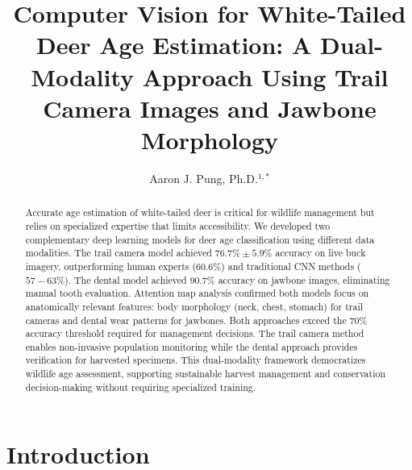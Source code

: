 \documentclass{iopjournal}
\begin{document}

\title{Computer Vision for White-Tailed Deer Age Estimation: A Dual-Modality Approach Using Trail Camera Images and Jawbone Morphology}

\author{Aaron J. Pung, Ph.D.$^{1,*}$}



\begin{abstract}
Accurate age estimation of white-tailed deer is critical for wildlife management but relies on specialized expertise that limits accessibility. We developed two complementary deep learning models for deer age classification using different data modalities. The trail camera model achieved $76.7\% \pm  5.9\%$ accuracy on live buck imagery, outperforming human experts ($60.6\%$) and traditional CNN methods ($57-63\%$). The dental model achieved $90.7\%$ accuracy on jawbone images, eliminating manual tooth evaluation. Attention map analysis confirmed both models focus on anatomically relevant features: body morphology (neck, chest, stomach) for trail cameras and dental wear patterns for jawbones. Both approaches exceed the $70\%$ accuracy threshold required for management decisions. The trail camera method enables non-invasive population monitoring while the dental approach provides verification for harvested specimens. This dual-modality framework democratizes wildlife age assessment, supporting sustainable harvest management and conservation decision-making without requiring specialized training.
\end{abstract}

\section{Introduction}
\end{document}
